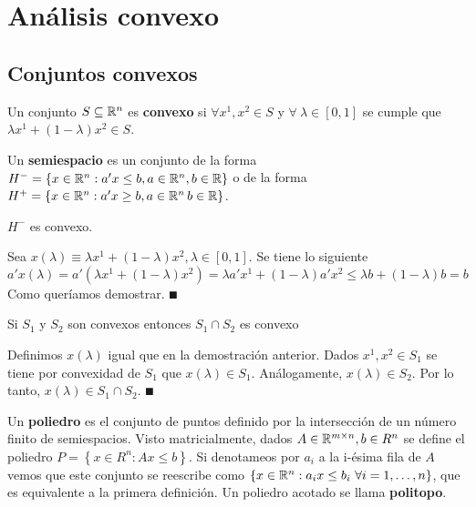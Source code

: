 \documentclass[PM.tex]{subfiles}
\begin{document}
\chapter{Análisis convexo}
\section{Conjuntos convexos}

\begin{defi}
Un conjunto $S\subseteq\mathbb{R}^n$ es \textbf{convexo} si $\forall x^1,x^2\in S$ y $\forall\ \lambda\in[0,1]$ se cumple que $\lambda x^1 + (1-\lambda)x^2\in S$.
\end{defi}

\begin{defi}
Un \textbf{semiespacio} es un conjunto de la forma $H^-=\left\{x\in\mathbb{R}^n: a'x\leq b, a\in\mathbb{R}^n, b\in\mathbb{R}\right\}$ o de la forma $H^+=\left\{x\in\mathbb{R}^n: a'x\geq b, a\in\mathbb{R}^n\,b\in\mathbb{R}\right\}$.
\end{defi}

\begin{prop}
$H^-$ es convexo.
\end{prop}

\begin{dem}
Sea $x(\lambda)\equiv \lambda x^1 + (1-\lambda)x^2, \lambda\in[0,1]$. Se tiene lo siguiente
\[
a'x(\lambda)=a'(\lambda x^1 + (1-\lambda)x^2)=\lambda a'x^1 +(1-\lambda)a'x^2\leq \lambda b+(1-\lambda)b=b
\]
Como queríamos demostrar. $\QED$
\end{dem}

\begin{prop}
Si $S_1$ y $S_2$ son convexos entonces $S_1\cap S_2$ es convexo
\end{prop}
\begin{dem}
Definimos $x(\lambda)$ igual que en la demostración anterior. Dados $x^1,x^2\in S_1$ se tiene por convexidad de $S_1$ que $x(\lambda)\in S_1$. Análogamente, $x(\lambda)\in S_2$. Por lo tanto, $x(\lambda)\in S_1\cap S_2$. $\QED$
\end{dem}

\begin{defi}
Un \textbf{poliedro} es el conjunto de puntos definido por la intersección de un número finito de semiespacios. Visto matricialmente, dados $A\in\mathbb{R}^{m\times n}, b\in R^n$ se define el poliedro $P=\left\{x\in R^n: Ax\leq b\right\}$. Si denotameos por $a_i$ a la i-ésima fila de $A$ vemos que este conjunto se reescribe como $\left\{x\in\mathbb{R}^n: a_ix\leq b_i\ \forall i=1,\dots, n\right\}$, que es equivalente a la primera definición. Un poliedro acotado se llama \textbf{politopo}. 
\end{defi}
\end{document}
